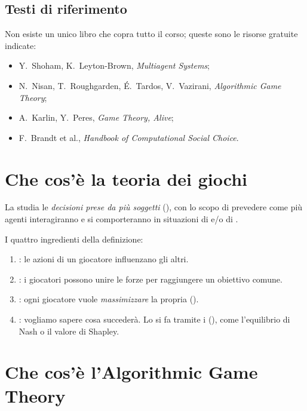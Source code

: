 \subsection*{Testi di riferimento}
Non esiste un unico libro che copra tutto il corso; queste sono le risorse gratuite indicate:
\begin{itemize}
  \item Y.~Shoham, K.~Leyton-Brown, \emph{Multiagent Systems};
  \item N.~Nisan, T.~Roughgarden, É.~Tardos, V.~Vazirani, \emph{Algorithmic Game Theory};
  \item A.~Karlin, Y.~Peres, \emph{Game Theory, Alive};
  \item F.~Brandt et al., \emph{Handbook of Computational Social Choice}.
\end{itemize}

\section{Che cos'è la teoria dei giochi}

\begin{definizione}
La  studia le \emph{decisioni prese da più soggetti}
(), con lo scopo di prevedere come più agenti
 interagiranno e si comporteranno in situazioni di 
e/o di .
\end{definizione}

I quattro ingredienti della definizione:
\begin{enumerate}
  \item {}: le azioni di un giocatore influenzano gli altri.
  \item {}: i giocatori possono unire le forze per raggiungere un obiettivo comune.
  \item {}: ogni giocatore vuole \emph{massimizzare} la propria
         ().
  \item {}: vogliamo sapere cosa succederà. Lo si fa tramite i
         (), come l'equilibrio di Nash o il valore di Shapley.
\end{enumerate}

\section{Che cos'è l'Algorithmic Game Theory}

